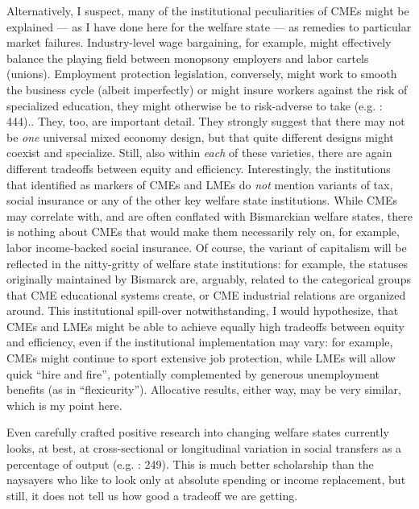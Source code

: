 \documentclass[11pt,a4paper,oneside,openright]{article}
\begin{document}
\begin{enumerate}
{		Alternatively, I suspect, many of the institutional peculiarities of \glspl{CME} might be explained --- as I have done here for the welfare state --- as remedies to particular market failures. 
		Industry-level wage bargaining, for example, might effectively balance the playing field between monopsony employers and labor cartels (unions). 
		Employment protection legislation, conversely, might work to smooth the business cycle (albeit imperfectly) or might insure workers against the risk of specialized education, they might otherwise be to risk-adverse to take (e.g. \citealt{Offe2003}: 444).}. 
	They, too, are important detail. 
	They strongly suggest that there may not be \emph{one} universal mixed economy design, but that quite different designs might coexist and specialize. 
	Still, also within \emph{each} of these varieties, there are again different tradeoffs between equity and efficiency. 
	Interestingly, the institutions that \citeauthor{HallSoskice-2001-aa} identified as markers of \glspl{CME} and \glspl{LME} do \emph{not} mention variants of tax, social insurance or any of the other key welfare state institutions. 
	While \glspl{CME} may correlate with, and are often conflated with Bismarckian welfare states, there is nothing about \glspl{CME} that would make them necessarily rely on, for example, labor income-backed social insurance. 
	Of course, the variant of capitalism will be reflected in the nitty-gritty of welfare state institutions: 
	for example, the statuses originally maintained by Bismarck are, arguably, related to the categorical groups that \gls{CME} educational systems create, or \gls{CME} industrial relations are organized around. 
	This institutional spill-over notwithstanding, I would hypothesize, that \glspl{CME} and \glspl{LME} might be able to achieve equally high tradeoffs between equity and efficiency, even if the institutional implementation may vary: 
	for example, \glspl{CME} might continue to sport extensive job protection, while \glspl{LME} will allow quick ``hire and fire'', potentially complemented by generous unemployment benefits (as in ``flexicurity''). Allocative results, either way, may be very similar, which is my point here.
	
	Even carefully crafted positive research into changing welfare states currently looks, at best, at cross-sectional or longitudinal variation in social transfers as a percentage of output (e.g. \citealt{Ravenhill2005}: 
249). This is much better scholarship than the naysayers who like to look only at absolute spending or income replacement, but still, it does not tell us how good a tradeoff we are getting.
	

\end{enumerate}
\end{document}
